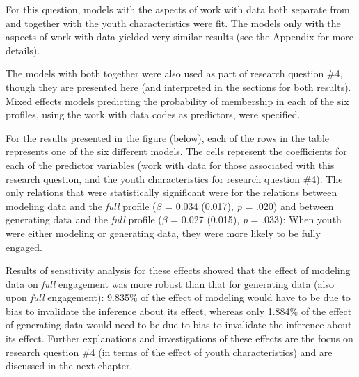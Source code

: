 \documentclass[]{book}
\theoremstyle{definition}
\theoremstyle{definition}
\theoremstyle{definition}
\theoremstyle{remark}
\begin{document}
For this question, models with the aspects of work with data both
separate from and together with the youth characteristics were fit. The
models only with the aspects of work with data yielded very similar
results (see the Appendix for more details).

The models with both together were also used as part of research
question \#4, though they are presented here (and interpreted in the
sections for both results). Mixed effects models predicting the
probability of membership in each of the six profiles, using the work
with data codes as predictors, were specified.

For the results presented in the figure (below), each of the rows in the
table represents one of the six different models. The cells represent
the coefficients for each of the predictor variables (work with data for
those associated with this research question, and the youth
characteristics for research question \#4). The only relations that were
statistically significant were for the relations between modeling data
and the \emph{full} profile (\(\beta\) = 0.034 (0.017), \emph{p} = .020)
and between generating data and the \emph{full} profile (\(\beta\) =
0.027 (0.015), \emph{p} = .033): When youth were either modeling or
generating data, they were more likely to be fully engaged.

Results of sensitivity analysis for these effects showed that the effect
of modeling data on \emph{full} engagement was more robust than that for
generating data (also upon \emph{full} engagement): 9.835\% of the
effect of modeling would have to be due to bias to invalidate the
inference about its effect, whereas only 1.884\% of the effect of
generating data would need to be due to bias to invalidate the inference
about its effect. Further explanations and investigations of these
effects are the focus on research question \#4 (in terms of the effect
of youth characteristics) and are discussed in the next chapter.
\end{document}

